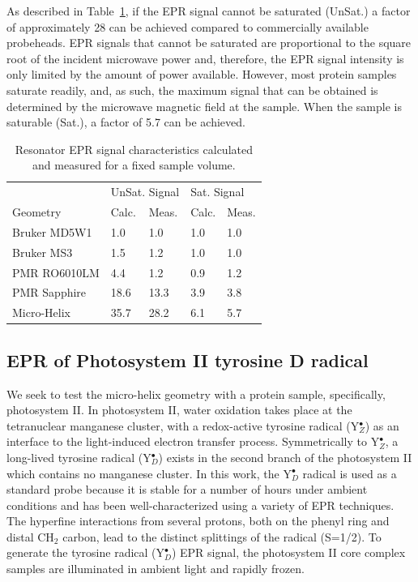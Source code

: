 As described in Table~\ref{table:signal}, if the EPR signal cannot be saturated (UnSat.) a factor of approximately 28 can be achieved compared to commercially available probeheads. EPR signals that cannot be saturated are proportional to the square root of the incident microwave power and, therefore, the EPR signal intensity is only limited by the amount of power available. However, most protein samples saturate readily, and, as such, the maximum signal that can be obtained is determined by the microwave magnetic field at the sample. When the sample is saturable (Sat.), a factor of 5.7 can be achieved. 

\begin{table}[htbp]
\centering
\caption[Resonator EPR signal characteristics calculated and measured.]{Resonator EPR signal characteristics calculated and measured for a fixed sample volume.}
\label{table:signal}
\begin{tabular}{l|l|l|l|l}
 & \multicolumn{2}{l|}{UnSat. Signal} & \multicolumn{2}{l}{Sat. Signal}\\
Geometry & Calc. & Meas. & Calc. & Meas.\\ \hline \hline
Bruker MD5W1 & 1.0 & 1.0 & 1.0 & 1.0 \\ \hline
Bruker MS3 & 1.5 & 1.2 & 1.0 & 1.0 \\ \hline
PMR RO6010LM & 4.4 & 1.2 & 0.9 & 1.2 \\ \hline
PMR Sapphire & 18.6 & 13.3 & 3.9 & 3.8 \\ \hline
Micro-Helix & 35.7 & 28.2 & 6.1 & 5.7 \\
\end{tabular}
\end{table}

\subsection{EPR of Photosystem II tyrosine D radical}
We seek to test the micro-helix geometry with a protein sample, specifically, photosystem II. In photosystem II, water oxidation takes place at the tetranuclear manganese cluster, with a redox-active tyrosine radical (Y$_Z^\bullet$) as an interface to the light-induced electron transfer process. \cite{STYRING201276} Symmetrically to Y$_Z^\bullet$, a long-lived tyrosine radical (Y$_D^\bullet$) exists in the second branch of the photosystem II which contains no manganese cluster. In this work, the Y$_D^\bullet$ radical is used as a standard probe because it is stable for a number of hours under ambient conditions\cite{Saito7690} and has been well-characterized using a variety of EPR techniques. \cite{Hofbauer6623, STYRING201276} The hyperfine interactions from several protons, both on the phenyl ring and distal CH$_2$ carbon, lead to the distinct splittings of the radical (S=1/2). To generate the tyrosine radical (Y$_D^\bullet$) EPR signal, the photosystem II core complex samples are illuminated in ambient light and rapidly frozen. 

